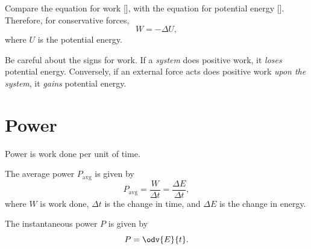 Compare the equation for work [],
with the equation for potential energy [].
Therefore, for conservative forces,
\begin{equation}
    W = - \Delta{U},
\end{equation}
where \(U\) is the potential energy.

Be careful about the signs for work.
If a \emph{system} does positive work, it \emph{loses} potential energy.
Conversely, if an external force acts does positive work \emph{upon the system},
it \emph{gains} potential energy.

\section{Power}

Power is work done per unit of time.

The average power \(P_\mathrm{avg}\) is given by
\begin{equation}
    P_\mathrm{avg} = \frac{W}{\Delta{t}} = \frac{\Delta{E}}{\Delta{t}},
\end{equation}
where \(W\) is work done, \(\Delta{t}\) is the change in time,
and \(\Delta{E}\) is the change in energy.

The instantaneous power \(P\) is given by
\begin{equation}
    P = \odv{E}{t}.
\end{equation}
